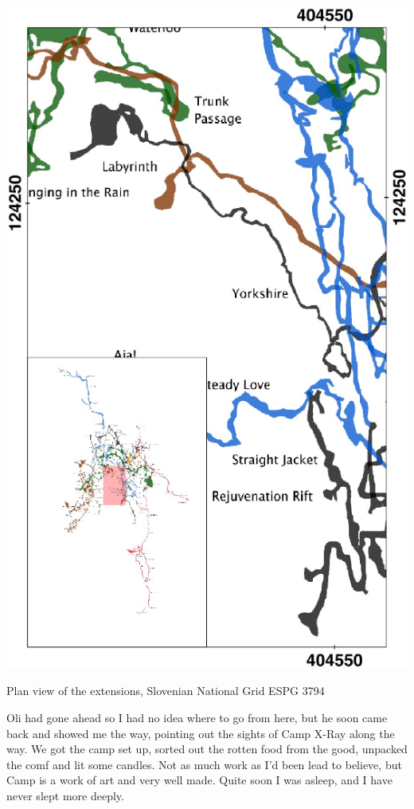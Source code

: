 \begin{marginfigure}
\checkoddpage \ifoddpage \forcerectofloat \else \forceversofloat \fi
\centering
 \includegraphics[width=\linewidth]{images/2015/jack-yorkshire-2015/labyrinth_inset}
 \caption{Plan view of the \protect{} extensions, Slovenian National Grid ESPG 3794}
 \label{Labyrinth inset}
\end{marginfigure}

Oli had gone ahead so I had no idea where to go from here, but he soon came back and showed me the way, pointing out the sights of Camp X-Ray along the way. We got the camp set up, sorted out the rotten food from the good, unpacked the comf and lit some candles. Not as much work as I'd been lead to believe, but Camp  is a work of art and very well made. Quite soon I was asleep, and I have never slept more deeply.

